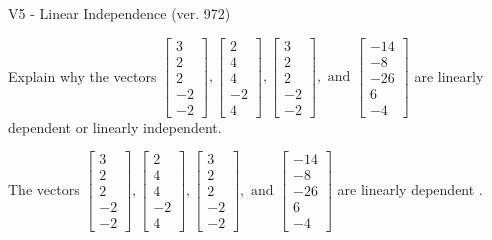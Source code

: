 \begin{exercise}
  \begin{exerciseTitle}V5 - Linear Independence (ver. 972)\end{exerciseTitle}
  \begin{exerciseStatement}
    Explain why the vectors \(\left[\begin{array}{r}
3 \\
2 \\
2 \\
-2 \\
-2
\end{array}\right] , \left[\begin{array}{r}
2 \\
4 \\
4 \\
-2 \\
4
\end{array}\right] , \left[\begin{array}{r}
3 \\
2 \\
2 \\
-2 \\
-2
\end{array}\right] , \text{ and } \left[\begin{array}{r}
-14 \\
-8 \\
-26 \\
6 \\
-4
\end{array}\right]\) are linearly dependent or linearly independent.	


  \end{exerciseStatement}
  \begin{exerciseAnswer}
   The vectors \(\left[\begin{array}{r}
3 \\
2 \\
2 \\
-2 \\
-2
\end{array}\right] , \left[\begin{array}{r}
2 \\
4 \\
4 \\
-2 \\
4
\end{array}\right] , \left[\begin{array}{r}
3 \\
2 \\
2 \\
-2 \\
-2
\end{array}\right] , \text{ and } \left[\begin{array}{r}
-14 \\
-8 \\
-26 \\
6 \\
-4
\end{array}\right]\) are 
  	 linearly dependent  .
  


  \end{exerciseAnswer}
\end{exercise}